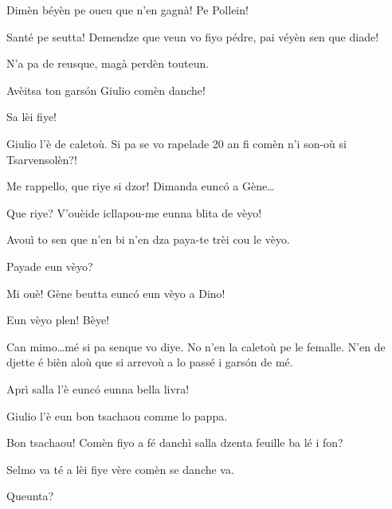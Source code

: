 \begin{drama}
\Djouiyaoueunspeaks{} Dimèn béyèn pe oueu que n'en gagnà! Pe Pollein!


\Marteunspeaks Santé pe seutta!  Demendze que veun vo fiyo pédre, pai véyèn sen que diade!

\Selmospeaks N'a pa de reusque, magà perdèn touteun.




\Djouiyaoudouspeaks{} Avèitsa ton gars\'on Giulio comèn danche!

\Marteunspeaks Sa lèi fiye!

\Selmospeaks	Giulio l'è de caletoù. Si pa se vo rapelade 20 an fi comèn n’i son-où si Tsarvensolèn?!


\Djouiyaoueunspeaks Me rappello, que riye si dzor! Dimanda eunc\'o a Gène\ldots

\Genespeaks{} Que riye? V'ouèide icllapou-me eunna blita de vèyo!

\Djouiyaoudouspeaks Avouì to sen que n'en bi n'en dza paya-te trèi cou le vèyo.

\Dinospeaks{} Payade eun vèyo?

\Djouiyaoueunspeaks Mi ouè! Gène beutta eunc\'o eun vèyo a Dino!

\Dinospeaks{} Eun vèyo plen! Bèye!

\Selmospeaks {} Can mimo\ldots mé si pa senque vo diye. No n'en la caletoù pe le femalle. N'en de djette é bièn aloù que si arrevoù a lo passé i gars\'on de mé.

\Djouiyaoudouspeaks Aprì salla l'è eunc\'o eunna bella livra!

\Selmospeaks Giulio l’è eun bon tsachaou comme lo pappa.

\Marteunspeaks{} Bon tsachaou! Comèn fiyo a fé danchì salla dzenta feuille ba lé i fon? 

\Djouiyaoudouspeaks Selmo va té a lèi fiye vère comèn se danche va.

\Selmospeaks Queunta?


\end{drama}
